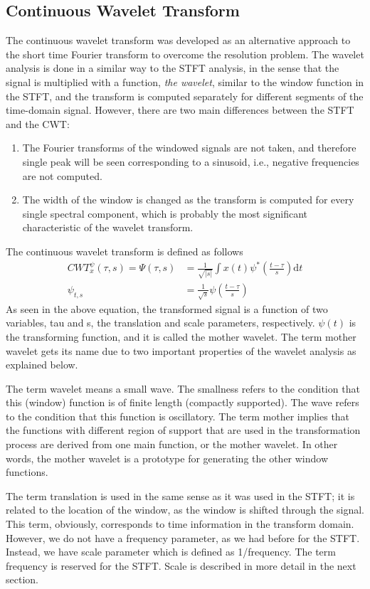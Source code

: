 \documentclass[12pt, a4paper, twoside]{report}
\begin{document}
\subsection{Continuous Wavelet Transform}
The continuous wavelet transform was developed as an alternative approach to the short time Fourier transform to overcome the resolution problem. The wavelet analysis is done in a similar way to the STFT analysis, in the sense that the signal is multiplied with a function, {\it the wavelet}, similar to the window function in the STFT, and the transform is computed separately for different segments of the time-domain signal. However, there are two main differences between the STFT and the CWT: 
\begin{enumerate}
\item The Fourier transforms of the windowed signals are not taken, and therefore single peak will be seen corresponding to a sinusoid, i.e., negative frequencies are not computed. 
\item The width of the window is changed as the transform is computed for every single spectral component, which is probably the most significant characteristic of the wavelet transform. 
\end{enumerate}
The continuous wavelet transform is defined as follows
\begin{align*}
CWT_{x}^{\psi}(\tau, s) = \Psi (\tau, s) &= \frac{1}{\sqrt{\left | s \right |}} \int x(t) \psi^{*} \left ( \frac{t-\tau}{s} \right ) \text{d}t \\
\psi_{t,s} &= \frac{1}{\sqrt{s}} \psi \left ( \frac{t - \tau}{s} \right )
\end{align*}
As seen in the above equation, the transformed signal is a function of two variables, tau and s, the translation and scale parameters, respectively. $\psi(t)$ is the transforming function, and it is called the mother wavelet. The term mother wavelet gets its name due to two important properties of the wavelet analysis as explained below.
\par
The term wavelet means a small wave. The smallness refers to the condition that this (window) function is of finite length (compactly supported). The wave refers to the condition that this function is oscillatory. The term mother implies that the functions with different region of support that are used in the transformation process are derived from one main function, or the mother wavelet. In other words, the mother wavelet is a prototype for generating the other window functions. 
\par
The term translation is used in the same sense as it was used in the STFT; it is related to the location of the window, as the window is shifted through the signal. This term, obviously, corresponds to time information in the transform domain. However, we do not have a frequency parameter, as we had before for the STFT. Instead, we have scale parameter which is defined as 1/frequency. The term frequency is reserved for the STFT. Scale is described in more detail in the next section.
\end{document}
